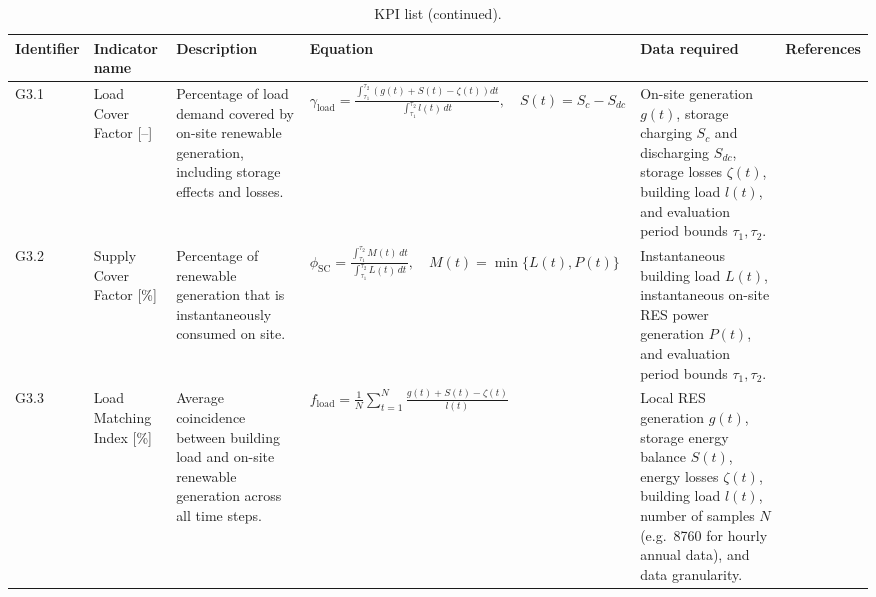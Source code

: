 \begin{table}
    \ContinuedFloat                          %
    \centering
    \caption[]{KPI list (continued).}

    \fontsize{9.5pt}{11pt}\selectfont
    \setlength{\tabcolsep}{2pt}
    \renewcommand{\arraystretch}{0.95}

    \begin{tabularx}{\textheight}{%
        >{\centering\arraybackslash}m{1.0cm}
        >{\centering\arraybackslash}p{2.2cm}
        >{\centering\arraybackslash}X
        >{\centering\arraybackslash}X
        >{\centering\arraybackslash}X
        >{\centering\arraybackslash}X}
        \hline
        \textbf{Identifier} & \textbf{Indicator name} & \textbf{Description} & \textbf{Equation} & \textbf{Data required} & \textbf{References}\\
        \hline
        G3.1 & Load Cover Factor {[}--{]} &
        Percentage of load demand covered by on-site renewable generation, including storage effects and losses. &
        \(\displaystyle \gamma_{\mathrm{load}}=\frac{\int_{\tau_1}^{\tau_2}\!\left(g(t)+S(t)-\zeta(t)\right)dt}{\int_{\tau_1}^{\tau_2} l(t)\,dt},\quad S(t)=S_c-S_{dc}\) &
        On-site generation $g(t)$, storage charging $S_c$ and discharging $S_{dc}$, storage losses $\zeta(t)$, building load $l(t)$, and evaluation period bounds $\tau_1, \tau_2$. \\
        \hline
        G3.2 & Supply Cover Factor %
        {[}\%{]} &
        Percentage of renewable generation that is instantaneously consumed on site. &
        \(\displaystyle \phi_{\mathrm{SC}}=\frac{\int_{\tau_1}^{\tau_2} M(t)\,dt}{\int_{\tau_1}^{\tau_2} L(t)\,dt},\quad M(t)=\min\{L(t),P(t)\}\) &
        Instantaneous building load $L(t)$, instantaneous on-site RES power generation $P(t)$, and evaluation period bounds $\tau_1, \tau_2$. \\
        \hline
        G3.3 & Load Matching Index {[}\%{]} &
        Average coincidence between building load and on-site renewable generation across all time steps. &
        \(\displaystyle f_{\mathrm{load}}=\frac{1}{N}\sum_{t=1}^{N}\frac{g(t)+S(t)-\zeta(t)}{l(t)}\) & 
        Local RES generation $g(t)$, storage energy balance $S(t)$, energy losses $\zeta(t)$, building load $l(t)$, number of samples $N$ (e.g.\ 8760 for hourly annual data), and data granularity. \\

\end{tabularx}
\end{table}
